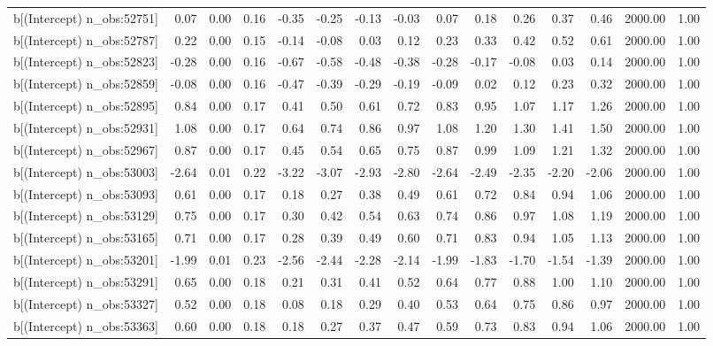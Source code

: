 \begin{table}[ht]
\begin{tabular}{rrrrrrrrrrrrrrr}
  b[(Intercept) n\_obs:52751] & 0.07 & 0.00 & 0.16 & -0.35 & -0.25 & -0.13 & -0.03 & 0.07 & 0.18 & 0.26 & 0.37 & 0.46 & 2000.00 & 1.00 \\ 
  b[(Intercept) n\_obs:52787] & 0.22 & 0.00 & 0.15 & -0.14 & -0.08 & 0.03 & 0.12 & 0.23 & 0.33 & 0.42 & 0.52 & 0.61 & 2000.00 & 1.00 \\ 
  b[(Intercept) n\_obs:52823] & -0.28 & 0.00 & 0.16 & -0.67 & -0.58 & -0.48 & -0.38 & -0.28 & -0.17 & -0.08 & 0.03 & 0.14 & 2000.00 & 1.00 \\ 
  b[(Intercept) n\_obs:52859] & -0.08 & 0.00 & 0.16 & -0.47 & -0.39 & -0.29 & -0.19 & -0.09 & 0.02 & 0.12 & 0.23 & 0.32 & 2000.00 & 1.00 \\ 
  b[(Intercept) n\_obs:52895] & 0.84 & 0.00 & 0.17 & 0.41 & 0.50 & 0.61 & 0.72 & 0.83 & 0.95 & 1.07 & 1.17 & 1.26 & 2000.00 & 1.00 \\ 
  b[(Intercept) n\_obs:52931] & 1.08 & 0.00 & 0.17 & 0.64 & 0.74 & 0.86 & 0.97 & 1.08 & 1.20 & 1.30 & 1.41 & 1.50 & 2000.00 & 1.00 \\ 
  b[(Intercept) n\_obs:52967] & 0.87 & 0.00 & 0.17 & 0.45 & 0.54 & 0.65 & 0.75 & 0.87 & 0.99 & 1.09 & 1.21 & 1.32 & 2000.00 & 1.00 \\ 
  b[(Intercept) n\_obs:53003] & -2.64 & 0.01 & 0.22 & -3.22 & -3.07 & -2.93 & -2.80 & -2.64 & -2.49 & -2.35 & -2.20 & -2.06 & 2000.00 & 1.00 \\ 
  b[(Intercept) n\_obs:53093] & 0.61 & 0.00 & 0.17 & 0.18 & 0.27 & 0.38 & 0.49 & 0.61 & 0.72 & 0.84 & 0.94 & 1.06 & 2000.00 & 1.00 \\ 
  b[(Intercept) n\_obs:53129] & 0.75 & 0.00 & 0.17 & 0.30 & 0.42 & 0.54 & 0.63 & 0.74 & 0.86 & 0.97 & 1.08 & 1.19 & 2000.00 & 1.00 \\ 
  b[(Intercept) n\_obs:53165] & 0.71 & 0.00 & 0.17 & 0.28 & 0.39 & 0.49 & 0.60 & 0.71 & 0.83 & 0.94 & 1.05 & 1.13 & 2000.00 & 1.00 \\ 
  b[(Intercept) n\_obs:53201] & -1.99 & 0.01 & 0.23 & -2.56 & -2.44 & -2.28 & -2.14 & -1.99 & -1.83 & -1.70 & -1.54 & -1.39 & 2000.00 & 1.00 \\ 
  b[(Intercept) n\_obs:53291] & 0.65 & 0.00 & 0.18 & 0.21 & 0.31 & 0.41 & 0.52 & 0.64 & 0.77 & 0.88 & 1.00 & 1.10 & 2000.00 & 1.00 \\ 
  b[(Intercept) n\_obs:53327] & 0.52 & 0.00 & 0.18 & 0.08 & 0.18 & 0.29 & 0.40 & 0.53 & 0.64 & 0.75 & 0.86 & 0.97 & 2000.00 & 1.00 \\ 
  b[(Intercept) n\_obs:53363] & 0.60 & 0.00 & 0.18 & 0.18 & 0.27 & 0.37 & 0.47 & 0.59 & 0.73 & 0.83 & 0.94 & 1.06 & 2000.00 & 1.00 \\ 

\end{tabular}
\end{table}
